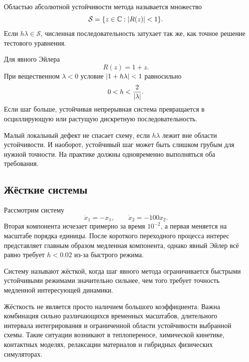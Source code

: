 \begin{definition}
\label{def:absolute-stability-region-v04}
Областью абсолютной устойчивости метода называется множество
\[
\mathcal S
=
\{z\in\mathbb{C}:\lvert R(z)\rvert<1\}.
\]
Если $h\lambda\in\mathcal S$, численная последовательность затухает так же, как точное решение тестового уравнения.
\end{definition}

Для явного Эйлера
\[
R(z)=1+z.
\]
При вещественном $\lambda<0$ условие $\lvert1+h\lambda\rvert<1$ равносильно
\begin{equation}
\label{eq:euler-step-stability-v04}
0<h<\frac{2}{\lvert\lambda\rvert}.
\end{equation}
Если шаг больше, устойчивая непрерывная система превращается в осциллирующую или растущую дискретную последовательность.

\begin{caution}
Малый локальный дефект не спасает схему, если $h\lambda$ лежит вне области устойчивости. И наоборот, устойчивый шаг может быть слишком грубым для нужной точности. На практике должны одновременно выполняться оба требования.
\end{caution}

\subsection{Жёсткие системы}

Рассмотрим систему
\begin{equation}
\label{eq:stiff-two-scale-system-v04}
\dot x_1=-x_1,
\qquad
\dot x_2=-100x_2.
\end{equation}
Вторая компонента исчезает примерно за время $10^{-2}$, а первая меняется на масштабе порядка единицы. После короткого переходного процесса интерес представляет главным образом медленная компонента, однако явный Эйлер всё равно требует $h<0.02$ из-за быстрого режима.

\begin{definition}
\label{def:stiffness-practical-v04}
Систему называют жёсткой, когда шаг явного метода ограничивается быстрыми устойчивыми режимами значительно сильнее, чем того требует точность медленной интересующей динамики.
\end{definition}

Жёсткость не является просто наличием большого коэффициента. Важна комбинация сильно различающихся временных масштабов, длительного интервала интегрирования и ограниченной области устойчивости выбранной схемы. Такие ситуации возникают в теплопереносе, химической кинетике, контактных моделях, релаксации материалов и гибридных физических симуляторах.

